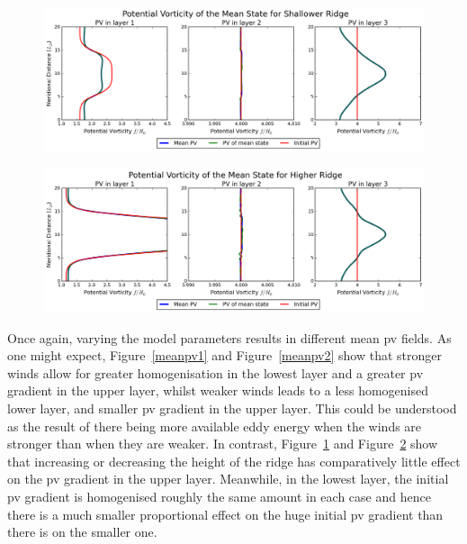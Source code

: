 \documentclass[12pt,a4paper]{report}
\newcommand*\figref[1]{Figure~\ref{#1}}
\begin{document}
 \begin{figure}
 	\centering
 	\includegraphics[width=\linewidth]{meanpv_3}
 	\caption{ }
 	\label{meanpv3}
 \end{figure}
 
 \begin{figure}
 	\centering
 	\includegraphics[width=\linewidth]{meanpv_4}
 	\caption{ }
 	\label{meanpv4}
 \end{figure}
 
 Once again, varying the model parameters results in different mean \gls{pv} fields.
 As one might expect, \figref{meanpv1} and \figref{meanpv2} show that stronger winds allow for greater homogenisation in the lowest layer and a 
 greater \gls{pv} gradient in the upper layer, whilst weaker winds
 leads to a less homogenised lower layer, and smaller \gls{pv} gradient in the upper layer.
  This could be understood as the result of there being more available eddy energy
  when the winds are stronger than when they are weaker. In contrast, 
  \figref{meanpv3} and \figref{meanpv4} show that increasing or decreasing the 
  height of the ridge has comparatively little effect on the \gls{pv} gradient in
  the upper layer. Meanwhile, in the lowest layer, the initial \gls{pv} gradient is
  homogenised roughly the same amount in each case and hence there is a much smaller 
  proportional effect  on the huge initial \gls{pv} gradient than there is on the 
  smaller one.
  
\end{document}
